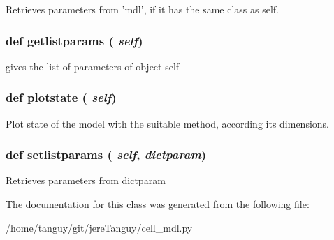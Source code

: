 \label{classcell__mdl_1_1_tissue_model_a18cbf53eb92c048eacd39a7844d1ec80}
\begin{DoxyVerb}Retrieves parameters from 'mdl', if it has the same class as self.\end{DoxyVerb}
 \hypertarget{classcell__mdl_1_1_tissue_model_af7fb94e292201b2f2f604451032f38cc}{
\subsubsection[{getlistparams}]{\setlength{\rightskip}{0pt plus 5cm}def getlistparams ( {\em self})}}
\label{classcell__mdl_1_1_tissue_model_af7fb94e292201b2f2f604451032f38cc}
\begin{DoxyVerb}gives the list of parameters of object self\end{DoxyVerb}
 \hypertarget{classcell__mdl_1_1_tissue_model_aa124f33cab14b4466d10c00c8ec82875}{
\subsubsection[{plotstate}]{\setlength{\rightskip}{0pt plus 5cm}def plotstate ( {\em self})}}
\label{classcell__mdl_1_1_tissue_model_aa124f33cab14b4466d10c00c8ec82875}
\begin{DoxyVerb}Plot state of the model with the suitable method, according its dimensions.\end{DoxyVerb}
 \hypertarget{classcell__mdl_1_1_tissue_model_ad28a0977f1887b1c30f096d38b28215c}{
\subsubsection[{setlistparams}]{\setlength{\rightskip}{0pt plus 5cm}def setlistparams ( {\em self}, \/   {\em dictparam})}}
\label{classcell__mdl_1_1_tissue_model_ad28a0977f1887b1c30f096d38b28215c}
\begin{DoxyVerb}Retrieves parameters from dictparam\end{DoxyVerb}
 

The documentation for this class was generated from the following file:\begin{DoxyCompactItemize}
\item 
/home/tanguy/git/jereTanguy/cell\_\-mdl.py\end{DoxyCompactItemize}
